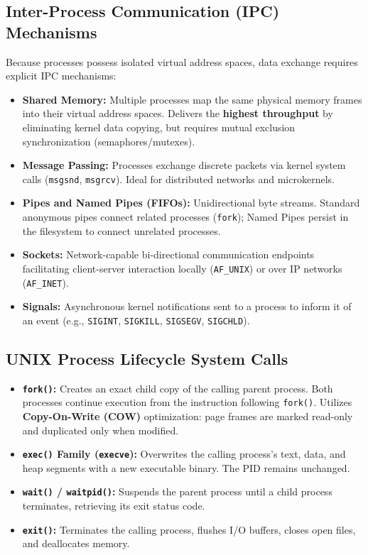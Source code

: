 \subsection{Inter-Process Communication (IPC) Mechanisms}
Because processes possess isolated virtual address spaces, data exchange requires explicit IPC mechanisms:
\begin{itemize}
    \item \textbf{Shared Memory:} Multiple processes map the same physical memory frames into their virtual address spaces. Delivers the \textbf{highest throughput} by eliminating kernel data copying, but requires mutual exclusion synchronization (semaphores/mutexes).
    \item \textbf{Message Passing:} Processes exchange discrete packets via kernel system calls (\texttt{msgsnd}, \texttt{msgrcv}). Ideal for distributed networks and microkernels.
    \item \textbf{Pipes and Named Pipes (FIFOs):} Unidirectional byte streams. Standard anonymous pipes connect related processes (\texttt{fork}); Named Pipes persist in the filesystem to connect unrelated processes.
    \item \textbf{Sockets:} Network-capable bi-directional communication endpoints facilitating client-server interaction locally (\texttt{AF\_UNIX}) or over IP networks (\texttt{AF\_INET}).
    \item \textbf{Signals:} Asynchronous kernel notifications sent to a process to inform it of an event (e.g., \texttt{SIGINT}, \texttt{SIGKILL}, \texttt{SIGSEGV}, \texttt{SIGCHLD}).
\end{itemize}

\subsection{UNIX Process Lifecycle System Calls}
\begin{itemize}
    \item \textbf{\texttt{fork()}:} Creates an exact child copy of the calling parent process. Both processes continue execution from the instruction following \texttt{fork()}. Utilizes \textbf{Copy-On-Write (COW)} optimization: page frames are marked read-only and duplicated only when modified.
    \item \textbf{\texttt{exec()} Family (\texttt{execve}):} Overwrites the calling process's text, data, and heap segments with a new executable binary. The PID remains unchanged.
    \item \textbf{\texttt{wait()} / \texttt{waitpid()}:} Suspends the parent process until a child process terminates, retrieving its exit status code.
    \item \textbf{\texttt{exit()}:} Terminates the calling process, flushes I/O buffers, closes open files, and deallocates memory.
\end{itemize}

